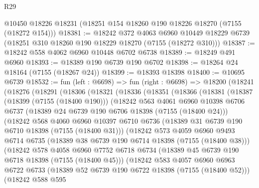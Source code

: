 \begin{lexlean}{R29}
\begin{coremodule}
    @10450
    @18226
    @18231
    (@18251 @154 @18260 @190 @18226 @18270 (@7155 (@18272 @154)))
@18381 := @18242
    @372
    @4063
    @6960
    @10449
    @18229
    @6739
    (@18251 @310 @18260 @190 @18229 @18270 (@7155 (@18272 @310)))
@18387 := @18242 @558 @4062 @6960 @10448 @6702 @6738
@18389 := @18249 @491 @6960
@18393 := @18389 @190 @6739 @190 @6702
@18398 := @18264 @24 @18164 (@7155 (@18267 @24))
@18399 := @18393 @18398
@18400 := @10695 @6739
@18532 := fun (left : @6698) =>
  fun (right : @6698) =>
  @18200
    (@18241
      (@18276
        (@18291
          (@18306
            (@18321
              (@18336
                (@18351
                  (@18366
                    (@18381
                      (@18387
                        (@18399 (@7155 (@18400 @190)))
                        (@18242
                          @563
                          @4061
                          @6960
                          @10398
                          @6706
                          @6737
                          (@18389 @24 @6739 @190 @6706 @18398 (@7155 (@18400 @24)))
                          (@18242
                            @568
                            @4060
                            @6960
                            @10397
                            @6710
                            @6736
                            (@18389 @31 @6739 @190 @6710 @18398 (@7155 (@18400 @31)))
                            (@18242
                              @573
                              @4059
                              @6960
                              @9493
                              @6714
                              @6735
                              (@18389 @38 @6739 @190 @6714 @18398 (@7155 (@18400 @38)))
                              (@18242
                                @578
                                @4058
                                @6960
                                @7752
                                @6718
                                @6734
                                (@18389 @45 @6739 @190 @6718 @18398 (@7155 (@18400 @45)))
                                (@18242
                                  @583
                                  @4057
                                  @6960
                                  @6963
                                  @6722
                                  @6733
                                  (@18389 @52 @6739 @190 @6722 @18398 (@7155 (@18400 @52)))
                                  (@18242
                                    @588
                                    @595

\end{coremodule}
\end{lexlean}

